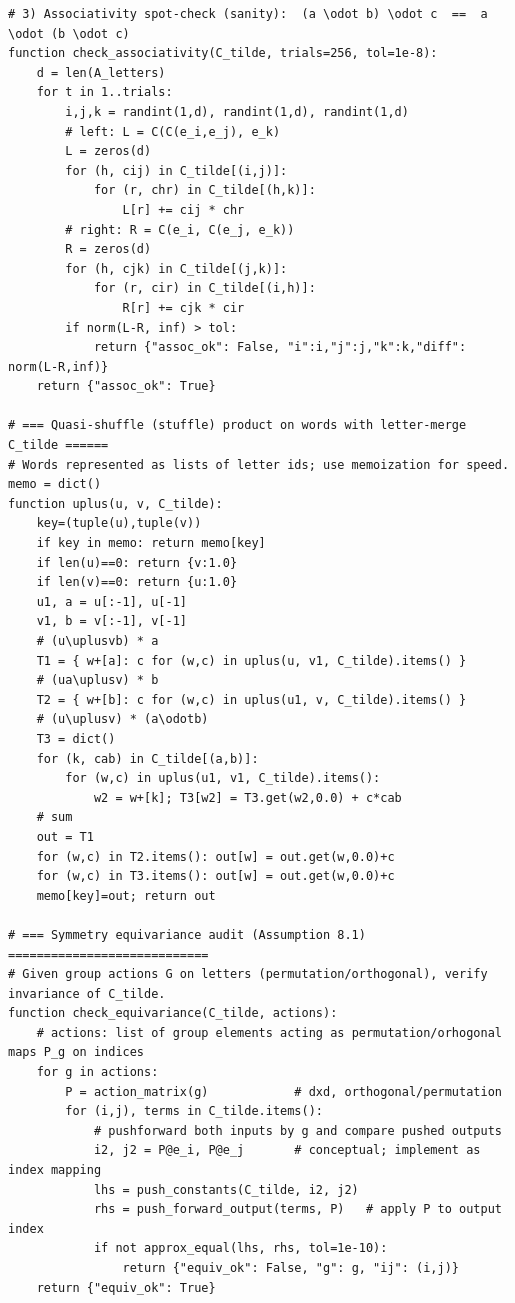\begin{lstlisting}
# 3) Associativity spot-check (sanity):  (a \odot b) \odot c  ==  a \odot (b \odot c)
function check_associativity(C_tilde, trials=256, tol=1e-8):
    d = len(A_letters)
    for t in 1..trials:
        i,j,k = randint(1,d), randint(1,d), randint(1,d)
        # left: L = C(C(e_i,e_j), e_k)
        L = zeros(d)
        for (h, cij) in C_tilde[(i,j)]:
            for (r, chr) in C_tilde[(h,k)]:
                L[r] += cij * chr
        # right: R = C(e_i, C(e_j, e_k))
        R = zeros(d)
        for (h, cjk) in C_tilde[(j,k)]:
            for (r, cir) in C_tilde[(i,h)]:
                R[r] += cjk * cir
        if norm(L-R, inf) > tol:
            return {"assoc_ok": False, "i":i,"j":j,"k":k,"diff": norm(L-R,inf)}
    return {"assoc_ok": True}

# === Quasi-shuffle (stuffle) product on words with letter-merge C_tilde ======
# Words represented as lists of letter ids; use memoization for speed.
memo = dict()
function uplus(u, v, C_tilde):
    key=(tuple(u),tuple(v))
    if key in memo: return memo[key]
    if len(u)==0: return {v:1.0}
    if len(v)==0: return {u:1.0}
    u1, a = u[:-1], u[-1]
    v1, b = v[:-1], v[-1]
    # (u\uplusvb) * a
    T1 = { w+[a]: c for (w,c) in uplus(u, v1, C_tilde).items() }
    # (ua\uplusv) * b
    T2 = { w+[b]: c for (w,c) in uplus(u1, v, C_tilde).items() }
    # (u\uplusv) * (a\odotb)
    T3 = dict()
    for (k, cab) in C_tilde[(a,b)]:
        for (w,c) in uplus(u1, v1, C_tilde).items():
            w2 = w+[k]; T3[w2] = T3.get(w2,0.0) + c*cab
    # sum
    out = T1
    for (w,c) in T2.items(): out[w] = out.get(w,0.0)+c
    for (w,c) in T3.items(): out[w] = out.get(w,0.0)+c
    memo[key]=out; return out

# === Symmetry equivariance audit (Assumption 8.1) ============================
# Given group actions G on letters (permutation/orthogonal), verify invariance of C_tilde.
function check_equivariance(C_tilde, actions):
    # actions: list of group elements acting as permutation/orhogonal maps P_g on indices
    for g in actions:
        P = action_matrix(g)            # dxd, orthogonal/permutation
        for (i,j), terms in C_tilde.items():
            # pushforward both inputs by g and compare pushed outputs
            i2, j2 = P@e_i, P@e_j       # conceptual; implement as index mapping
            lhs = push_constants(C_tilde, i2, j2)
            rhs = push_forward_output(terms, P)   # apply P to output index
            if not approx_equal(lhs, rhs, tol=1e-10):
                return {"equiv_ok": False, "g": g, "ij": (i,j)}
    return {"equiv_ok": True}


\end{lstlisting}
